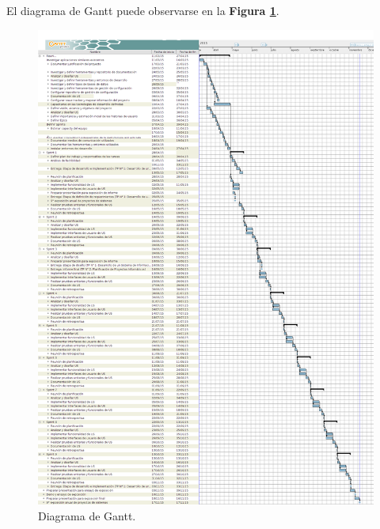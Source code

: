El diagrama de Gantt puede observarse en la \textbf{Figura \ref{imagenGantt}}.

\begin{figure}
  \centering
  \includegraphics[width=.8\textwidth]{img/tp2_definicion/gantt}
  \caption{Diagrama de Gantt.}
  \label{imagenGantt}
\end{figure}

\newpage

                   
    
